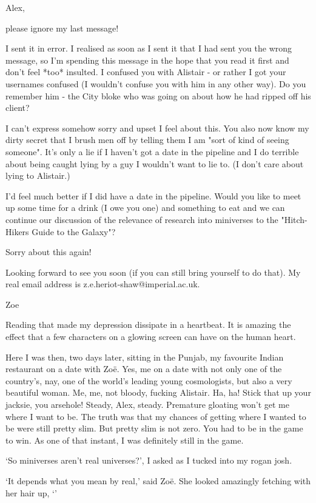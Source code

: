 {\twelvett Alex,

please ignore my last message!

I sent it in error. I realised as soon as I sent it that I had sent
you the wrong message, so I'm spending this message in the hope that
you read it first and don't feel *too* insulted. I confused you with
Alistair - or rather I got your usernames confused (I wouldn't
confuse you with him in any other way). Do you remember him - the
City bloke who was going on about how he had ripped off his client?

I can't express somehow sorry and upset I feel about this. You also
now know my dirty secret that I brush men off by telling them I am
"sort of kind of seeing someone". It's only a lie if I haven't got a
date in the pipeline and I do terrible about being caught lying by a
guy I wouldn't want to lie to. (I don't care about lying to
Alistair.)

I'd feel much better if I did have a date in the pipeline. Would you
like to meet up some time for a drink (I owe you one) and something to eat and we
can continue our discussion of the relevance of research into
miniverses to the "Hitch-Hikers Guide to the Galaxy"?

Sorry about this again!

Looking forward to see you soon (if you can still bring yourself to
do that). My real email address is z.e.heriot-shaw@imperial.ac.uk.

Zoe}

Reading that made my depression dissipate in a heartbeat. It is
amazing the effect that a few characters on a glowing screen can
have on the human heart.

Here I was then, two days later, sitting in the Punjab, my favourite
Indian restaurant on a date with Zoë. Yes, {\twelveit me\/} on
a date with not only one of the country's, nay, one of the
{\twelveit world's\/} leading young cosmologists, but also a very
beautiful woman. Me, {\twelveit me}, not bloody, fucking Alistair.
Ha, ha! Stick that up your jacksie, you arsehole! Steady, Alex,
steady. Premature gloating won't get me where I want to be. The
truth was that my chances of getting where I wanted to be were still
pretty slim. But pretty slim is not zero. You had to be in the game
to win. As one of that instant, I was definitely still in the game.

`So miniverses aren't real universes?', I asked as I tucked into my
rogan josh.

`It depends what you mean by real,' said Zoë. She looked
amazingly fetching with her hair up, `'

